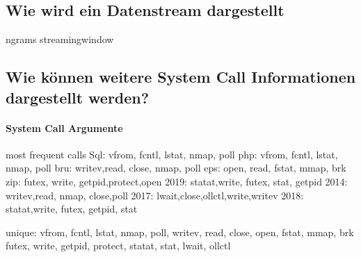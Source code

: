     \subsection{Wie wird ein Datenstream dargestellt}
        ngrams
        streamingwindow

    \subsection{Wie können weitere System Call Informationen dargestellt werden?}
        \paragraph{System Call Argumente}  
            most frequent calls
            Sql: vfrom, fcntl, lstat, nmap, poll
            php: vfrom, fcntl, lstat, nmap, poll
            bru: writev,read,  close, nmap, poll
            eps: open,  read,  fstat, mmap, brk
            zip: futex, write, getpid,protect,open
            2019: statat,write, futex, stat, getpid
            2014: writev,read,  nmap,  close,poll
            2017: lwait,close,ollctl,write,writev
            2018: statat,write, futex, getpid, stat


            unique:
                vfrom, fcntl, lstat, nmap, poll, writev, read, close, open, fstat, mmap, brk
                futex, write, getpid, protect, statat, stat, lwait, ollctl

